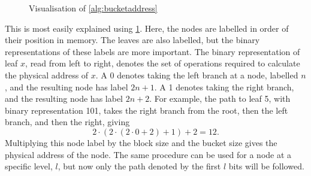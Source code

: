 \documentclass[12pt,a4paper,twoside,openright]{report}
\begin{document}
\begin{figure}[t]
    \centering
  \caption{Visualisation of \cref{alg:bucketaddress}}
  \label{fig:bucketaddress}
\end{figure}

This is most easily explained using \cref{fig:bucketaddress}. Here, the nodes are labelled in order of their position in memory. The leaves are also labelled, but the binary representations of these labels are more important. The binary representation of leaf $x$, read from left to right, denotes the set of operations required to calculate the physical address of $x$. A 0 denotes taking the left branch at a node, labelled $n$, and the resulting node has label $2n + 1$. A 1 denotes taking the right branch, and the resulting node has label $2n+2$. For example, the path to leaf 5, with binary representation 101, takes the right branch from the root, then the left branch, and then the right, giving $$2 \cdot (2 \cdot (2 \cdot 0 + 2) + 1) + 2 = 12.$$ Multiplying this node label by the block size and the bucket size gives the physical address of the node. The same procedure can be used for a node at a specific level, $l$, but now only the path denoted by the first $l$ bits will be followed.
\end{document}
